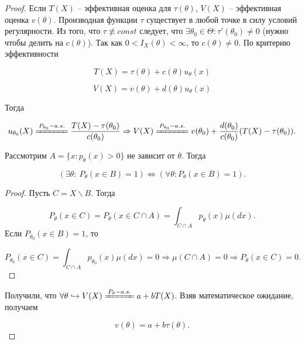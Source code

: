 \begin{proof}
Если $\displaystyle T( X)$ -- эффективная оценка для $\displaystyle \tau ( \theta )$, $\displaystyle V( X)$ -- эффективная оценка $\displaystyle v( \theta )$. Производная функции $\displaystyle \tau $ существует в любой точке в силу условий регулярности. Из того, что $\displaystyle \tau \nequiv const$ следует, что $\displaystyle \exists \theta _{0} \in \Theta :\tau '( \theta _{0}) \neq 0$ (нужно чтобы делить на $c(\theta)$). Так как $\displaystyle 0< I_{X}( \theta ) < \infty $, то $\displaystyle c( \theta ) \neq 0$. По критерию эффективности 

\begin{equation*}
    T(X)=\tau(\theta)+c(\theta)u_\theta(x)
\end{equation*}

\begin{equation*}   
    V(X)=v(\theta)+d(\theta)u_\theta(x)
\end{equation*}

Тогда

\begin{equation*}
u_{\theta _{0}}( X)\xlongequal{P_{\theta _{0}} -a.s.}\frac{T( X) -\tau ( \theta _{0})}{c( \theta _{0})} \Rightarrow V( X)\xlongequal{P_{\theta _{0}} -a.s.} v( \theta _{0}) +\frac{d( \theta _{0})}{c( \theta _{0})}( T( X) -\tau ( \theta _{0})) .
\end{equation*}

\begin{exercise}
    Рассмотрим $\displaystyle A=\{x:p_{\theta }( x)  >0\}$ не зависит от $\displaystyle \theta $. Тогда


    \begin{equation*}
    ( \exists \theta :\ P_{\theta }( x\in B) =1) \Leftrightarrow ( \forall \theta :P_{\theta }( x\in B) =1) .
    \end{equation*}
\end{exercise}


\begin{proof}
Пусть $\displaystyle C=X\backslash B$. Тогда


\begin{equation*}
P_{\theta }( x\in C) =P_{\theta }( x\in C\cap A) =\int _{C\cap A} p_{\theta }( x) \mu ( dx) .
\end{equation*}
Если $\displaystyle P_{\theta _{0}}( x\in B) =1$, то


\begin{equation*}
P_{\theta _{0}}( x\in C) =\int _{C\cap A} p_{\theta _{0}}( x) \mu ( dx) =0\Rightarrow \mu ( C\cap A) =0\Rightarrow P_{\theta }( x\in C) =0.
\end{equation*}
\end{proof}

Получили, что $\displaystyle \forall \theta \hookrightarrow V( X)\xlongequal{P_{\theta } -a.s.} a+bT( X)$. Взяв математическое ожидание, получаем

\begin{equation*}
v( \theta ) =a+b\tau ( \theta ) .
\end{equation*}
\end{proof}